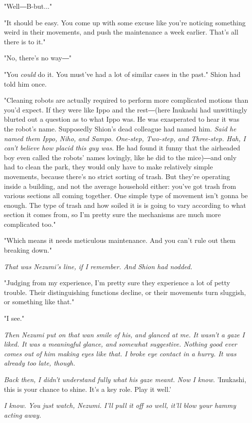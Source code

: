 "Well―B-but..."

"It should be easy. You come up with some excuse like you're noticing
something weird in their movements, and push the maintenance a week
earlier. That's all there is to it."

"No, there's no way―"

"You \emph{could} do it. You must've had a lot of similar cases in the past."
Shion had told him once.

"Cleaning robots are actually required to perform more complicated
motions than you'd expect. If they were like Ippo and the rest―(here
Inukashi had unwittingly blurted out a question as to what Ippo was. He
was exasperated to hear it was the robot's name. Supposedly Shion's dead
colleague had named him. \emph{Said he named them Ippo, Niho, and Sampo.
	One-step, Two-step, and Three-step. Hah, I can't believe how placid this
	guy was.} He had found it funny that the airheaded boy even called the
robots' names lovingly, like he did to the mice)―and only had to clean
the park, they would only have to make relatively simple movements,
because there's no strict sorting of trash. But they're operating inside
a building, and not the average household either: you've got trash from
various sections all coming together. One simple type of movement isn't
gonna be enough. The type of trash and how soiled it is is going to vary
according to what section it comes from, so I'm pretty sure the
mechanisms are much more complicated too."~

"Which means it needs meticulous maintenance. And you can't rule out
them breaking down."

\emph{That was Nezumi's line, if I remember. And Shion had nodded.}

"Judging from my experience, I'm pretty sure they experience a lot of
petty trouble. Their distinguishing functions decline, or their
movements turn sluggish, or something like that."

"I see."

\emph{Then Nezumi put on that wan smile of his, and glanced at me. It wasn't a
	gaze I liked. It was a meaningful glance, and somewhat suggestive.
	Nothing good ever comes out of him making eyes like that. I broke eye
	contact in a hurry. It was already too late, though.}

\emph{Back then, I didn't understand fully what his gaze meant. Now I know.}
'Inukashi, this is your chance to shine. It's a key role. Play it well.'

\emph{I know. You just watch, Nezumi. I'll pull it off so well, it'll blow
	your hammy acting away.}

